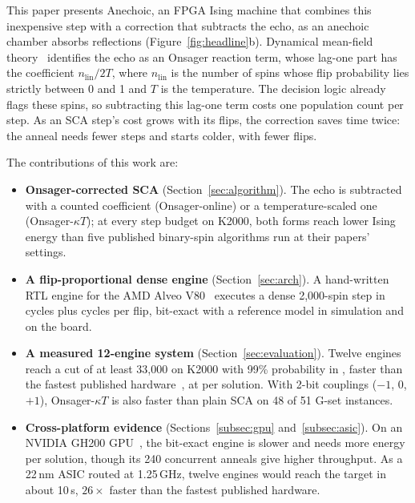 This paper presents Anechoic, an FPGA Ising machine that combines this inexpensive step with a correction that subtracts the echo, as an anechoic chamber absorbs reflections (Figure~\ref{fig:headline}b). Dynamical mean-field theory~\cite{sompolinsky1982relaxational,eissfeller1992new,coolen2001statistical} identifies the echo as an Onsager reaction term, whose lag-one part has the coefficient $n_{\mathrm{lin}}/2T$, where $n_{\mathrm{lin}}$ is the number of spins whose flip probability lies strictly between 0 and 1 and $T$ is the temperature. The decision logic already flags these spins, so subtracting this lag-one term costs one population count per step. As an SCA step's cost grows with its flips, the correction saves time twice: the anneal needs fewer steps and starts colder, with fewer flips.

The contributions of this work are:
\begin{itemize}[leftmargin=*]
\item \textbf{Onsager-corrected SCA} (Section~\ref{sec:algorithm}). The echo is subtracted with a counted coefficient (Onsager-online) or a temperature-scaled one (Onsager-$\kappa T$); at every step budget on K2000, both forms reach lower Ising energy than five published binary-spin algorithms run at their papers' settings.
\item \textbf{A flip-proportional dense engine} (Section~\ref{sec:arch}). A hand-written RTL engine for the AMD Alveo V80~\cite{amd_v80} executes a dense 2{,}000-spin step in \cycStep{} cycles plus \cycFlip{} cycles per flip, bit-exact with a reference model in simulation and on the board.
\item \textbf{A measured 12-engine system} (Section~\ref{sec:evaluation}). Twelve engines reach a cut of at least 33{,}000 on K2000 with 99\% probability in \ttsP{}, \spdBSB{} faster than the fastest published hardware~\cite{goto2021high}, at \ets{} per solution. With 2-bit couplings ($-1$, 0, $+1$), Onsager-$\kappa T$ is also faster than plain SCA on 48 of 51 G-set instances.
\item \textbf{Cross-platform evidence} (Sections~\ref{subsec:gpu} and~\ref{subsec:asic}). On an NVIDIA GH200 GPU~\cite{nvidia_gh200}, the bit-exact engine is \gpuSpd{} slower and needs \gpuEratio{} more energy per solution, though its 240 concurrent anneals give higher throughput. As a 22\,nm ASIC routed at 1.25\,GHz, twelve engines would reach the target in about 10\,\textmu s, $26\times$ faster than the fastest published hardware.
\end{itemize}
